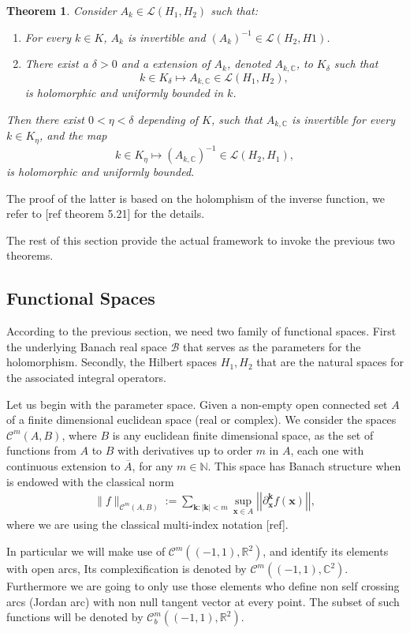 \documentclass{article}
\newtheorem{theorem}{Theorem}[section]
\newcommand{\todo}[1]{{\color{red}[#1]}}
\newcommand{\IC}{{\mathbb C}}
\newcommand{\IN}{{\mathbb N}}
\newcommand{\IR}{{\mathbb R}}
\newcommand{\cmspace}[3]{\mathcal{C}^{#1} \left( #2, #3 \right)}
\newcommand{\rgeo}[1]{\mathcal{C}_b^{#1}\left( (-1,1), \IR^2 \right)}
\newcommand{\bk}{\bm{k}}
\newcommand{\bx}{\bm{x}}
\begin{document}
\begin{theorem}
\label{thrm:abtractinverse}
Consider $A_k \in \mathcal{L}(H_1,H_2)$ such that: 
\begin{enumerate}
\item 
For every $k \in K$, $A_k$ is invertible and $(A_k)^{-1} \in \mathcal{L}(H_2,H1)$. 
\item 
There exist a $\delta >0$ and a extension of $A_k$, denoted $A_{k,\IC}$, to $K_\delta$ such that 
$$k \in K_\delta \mapsto A_{k,\IC} \in \mathcal{L}(H_1,H_2),$$
 is holomorphic and uniformly bounded in $k$. 
\end{enumerate}
Then there exist $0<\eta<\delta$ depending of $K$, such that 
$A_{k,\IC}$ is invertible for every $k \in K_\eta$, and the map 
$$k \in K_\eta \mapsto (A_{k,\IC})^{-1} \in \mathcal{L}(H_2,H_1),$$ is holomorphic and uniformly bounded. 
\end{theorem} 
The proof of the latter is based on the holomphism of the inverse function, we refer to \todo{ref theorem 5.21} for the details.

The rest of this section provide the actual framework to invoke the previous two theorems. 
\subsection{Functional Spaces}

According to the previous section, we need two family of functional spaces. First the underlying Banach real space $\mathcal{B}$ that serves as the parameters for the holomorphism. Secondly, the Hilbert spaces $H_1,H_2$ that are the natural spaces for the associated integral operators. 

Let us begin with the parameter space. Given a non-empty open connected set $A$ of a finite dimensional euclidean space (real or complex). We consider the spaces $\cmspace{m}{A}{B}$, where $B$ is any euclidean finite dimensional space, as the set of functions from $A$ to $B$ with derivatives up to order $m$ in $A$, each one with continuous extension to $\overline{A}$, for any $m \in \IN$. This space has Banach structure when is endowed with the classical norm 
\begin{align*}
\| f \|_{\cmspace{m}{A}{B}} := \sum_{\bk: |\bk| < m } \sup_{\bx \in A}  \left\vert\left\vert\partial_{\bx}^{\bk} f(\bx) \right\vert\right\vert,
\end{align*}
where we are using the classical multi-index notation \todo{ref}. 

In particular we will make use of $\cmspace{m}{(-1,1)}{\IR^2}$, and identify its elements with open arcs, Its complexification is denoted by $\cmspace{m}{(-1,1)}{\IC^2}$. Furthermore we are going to only use those elements who define non self crossing arcs (Jordan arc) with non null tangent vector at every point. The subset of such functions will be denoted by $\rgeo{m}$. 
\end{document}
